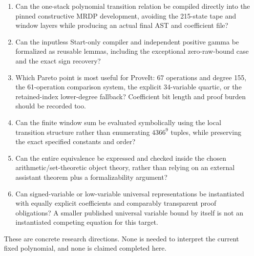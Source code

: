 \documentclass[11pt]{article}
\begin{document}
\begin{enumerate}
\item Can the one-stack polynomial transition relation be compiled directly into the pinned constructive MRDP development, avoiding the 215-state tape and window layers while producing an actual final AST and coefficient file?
\item Can the inputless Start-only compiler and independent positive gamma be formalized as reusable lemmas, including the exceptional zero-raw-bound case and the exact sign recovery?
\item Which Pareto point is most useful for ProveIt: 67 operations and degree 155, the 61-operation comparison system, the explicit 34-variable quartic, or the retained-index lower-degree fallback? Coefficient bit length and proof burden should be recorded too.
\item Can the finite window sum be evaluated symbolically using the local transition structure rather than enumerating \(4366^9\) tuples, while preserving the exact specified constants and order?
\item Can the entire equivalence be expressed and checked inside the chosen arithmetic/set-theoretic object theory, rather than relying on an external assistant theorem plus a formalizability argument?
\item Can signed-variable or low-variable universal representations be instantiated with equally explicit coefficients and comparably transparent proof obligations? A smaller published universal variable bound by itself is not an instantiated competing equation for this target.
\end{enumerate}
These are concrete research directions. None is needed to interpret the current fixed polynomial, and none is claimed completed here.
\end{document}

